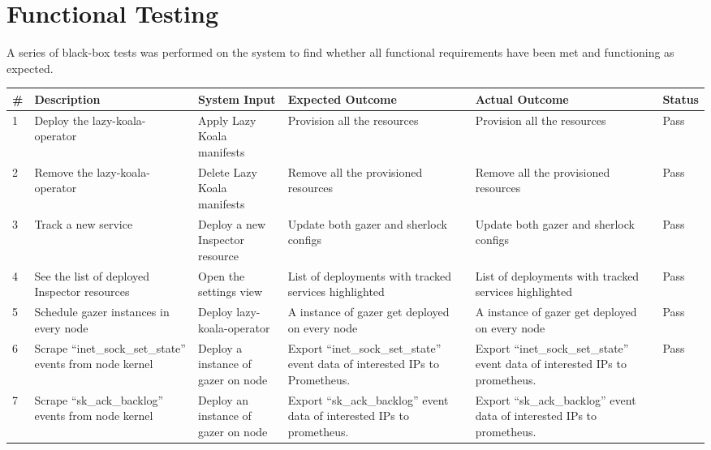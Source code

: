 \section{Functional Testing}\label{sec:functional-testing}

A series of black-box tests was performed on the system to find whether all functional requirements have been met and functioning as expected.

\begin{longtable}{|p{3mm}|p{30mm}|p{27mm}|p{33mm}|p{33mm}|p{10mm}|}
    \hline
    \textbf{\#} &
      \textbf{Description} &
      \textbf{System Input} &
      \textbf{Expected Outcome} &
      \textbf{Actual Outcome} &
      \textbf{Status} \\ \hline
    1 &
      Deploy the \ac{lazy-koala-operator} &
      Apply Lazy Koala manifests &
      Provision all the resources &
      Provision all the resources &
      Pass \\ \hline
    2 &
      Remove the \ac{lazy-koala-operator} &
      Delete Lazy Koala manifests &
      Remove all the provisioned resources &
      Remove all the provisioned resources &
      Pass \\ \hline
    3 &
      Track a new service &
      Deploy a new Inspector resource &
      Update both \ac{gazer} and \ac{sherlock} configs &
      Update both \ac{gazer} and \ac{sherlock} configs &
      Pass \\ \hline
    4 &
      See the list of deployed Inspector resources &
      Open the settings view &
      List of deployments with tracked services highlighted &
      List of deployments with tracked services highlighted &
      Pass \\ \hline
    5 &
      Schedule \ac{gazer} instances in every node &
      Deploy \ac{lazy-koala-operator} &
      A instance of \ac{gazer} get deployed on every node &
      A instance of \ac{gazer} get deployed on every node &
      Pass \\ \hline
    6 &
      Scrape “inet\_sock\_set\_state” events from node kernel &
      Deploy a instance of \ac{gazer} on node &
      Export “inet\_sock\_set\_state” event data of interested IPs to Prometheus. &
      Export “inet\_sock\_set\_state” event data of interested IPs to prometheus. &
      Pass \\ \hline
    7 &
      Scrape “sk\_ack\_backlog” events from node kernel &
      Deploy an instance of \ac{gazer} on node &
      Export “sk\_ack\_backlog” event data of interested IPs to prometheus. &
      Export “sk\_ack\_backlog” event data of interested IPs to prometheus. &

\end{longtable}
